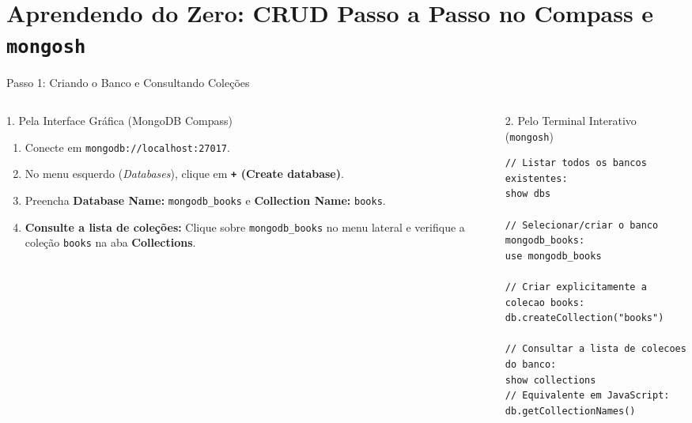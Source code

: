 \section[CRUD do Zero: Compass e mongosh]{Aprendendo do Zero: CRUD Passo a Passo no Compass e \texttt{mongosh}}

\begin{frame}[fragile]{Passo 1: Criando o Banco e Consultando Coleções}
  \vspace{0.05cm}
  \begin{columns}[t]
    \begin{column}{0.48\textwidth}
      \alert{1. Pela Interface Gráfica (MongoDB Compass)}\par
      \scriptsize
      \begin{enumerate}
        \item Conecte em \texttt{mongodb://localhost:27017}.
        \item No menu esquerdo (\textit{Databases}), clique em \textbf{\texttt{+} (Create database)}.
        \item Preencha \textbf{Database Name:} \texttt{mongodb\_books} e \textbf{Collection Name:} \texttt{books}.
        \item \textbf{Consulte a lista de coleções:} Clique sobre \texttt{mongodb\_books} no menu lateral e verifique a coleção \texttt{books} na aba \textbf{Collections}.
      \end{enumerate}
    \end{column}
    \begin{column}{0.48\textwidth}
      \alert{2. Pelo Terminal Interativo (\texttt{mongosh})}\par
      \begin{lstlisting}[language=mongosh]
// Listar todos os bancos existentes:
show dbs

// Selecionar/criar o banco mongodb_books:
use mongodb_books

// Criar explicitamente a colecao books:
db.createCollection("books")

// Consultar a lista de colecoes do banco:
show collections
// Equivalente em JavaScript:
db.getCollectionNames()
      \end{lstlisting}
    \end{column}
  \end{columns}
\end{frame}

